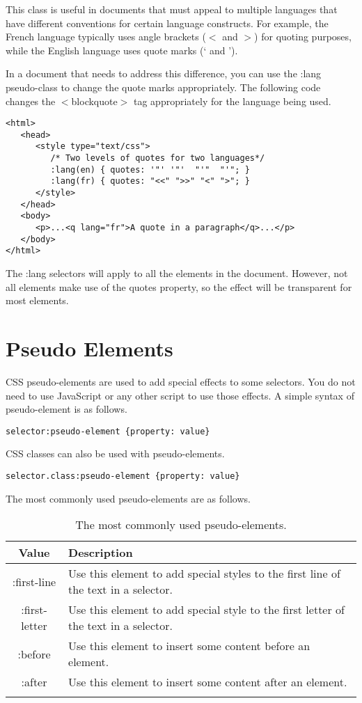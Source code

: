 \documentclass[a4paper,oneside]{book}
\numberwithin{equation}{chapter}
\begin{document}
This class is useful in documents that must appeal to multiple languages that have different conventions for certain language constructs. For example, the French language typically uses angle brackets ($<$ and $>$) for quoting purposes, while the English language uses quote marks (` and ').

In a document that needs to address this difference, you can use the :lang pseudo-class to change the quote marks appropriately. The following code changes the $<$blockquote$>$ tag appropriately for the language being used.
\begin{verbatim}
<html>
   <head>
      <style type="text/css">
         /* Two levels of quotes for two languages*/
         :lang(en) { quotes: '"' '"'  "'"  "'"; }
         :lang(fr) { quotes: "<<" ">>" "<" ">"; }
      </style>
   </head>
   <body>
      <p>...<q lang="fr">A quote in a paragraph</q>...</p>
   </body>
</html>
\end{verbatim}
The :lang selectors will apply to all the elements in the document. However, not all elements make use of the quotes property, so the effect will be transparent for most elements.
\section{Pseudo Elements}
CSS pseudo-elements are used to add special effects to some selectors. You do not need to use JavaScript or any other script to use those effects. A simple syntax of pseudo-element is as follows.
\begin{verbatim}
selector:pseudo-element {property: value}
\end{verbatim}
CSS classes can also be used with pseudo-elements.
\begin{verbatim}
selector.class:pseudo-element {property: value}
\end{verbatim}
The most commonly used pseudo-elements are as follows.
\begin{center}
\begin{longtable}{|c|p{9cm}|}
\hline
\textbf{Value} & \textbf{Description}\\
\hline
:first-line & Use this element to add special styles to the first line of the text in a selector.\\
\hline
:first-letter & Use this element to add special style to the first letter of the text in a selector.\\
\hline
:before & Use this element to insert some content before an element.\\
\hline
:after & Use this element to insert some content after an element.\\
\hline
\caption{The most commonly used pseudo-elements.}
\end{longtable}
\end{center}
\end{document}
